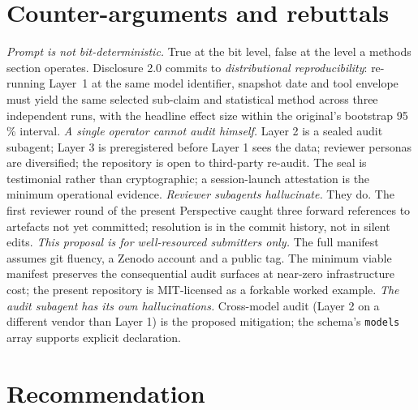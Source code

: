 \documentclass[11pt,a4paper]{article}
\begin{document}
\section{Counter-arguments and rebuttals}

\emph{Prompt is not bit-deterministic.} True at the bit level, false at the level a methods section operates. Disclosure 2.0 commits to \emph{distributional reproducibility}: re-running Layer~1 at the same model identifier, snapshot date and tool envelope must yield the same selected sub-claim and statistical method across three independent runs, with the headline effect size within the original's bootstrap 95\,\% interval. \emph{A single operator cannot audit himself.} Layer 2 is a sealed audit subagent; Layer 3 is preregistered before Layer 1 sees the data; reviewer personas are diversified; the repository is open to third-party re-audit. The seal is testimonial rather than cryptographic; a session-launch attestation is the minimum operational evidence. \emph{Reviewer subagents hallucinate.} They do. The first reviewer round of the present Perspective caught three forward references to artefacts not yet committed; resolution is in the commit history, not in silent edits. \emph{This proposal is for well-resourced submitters only.} The full manifest assumes git fluency, a Zenodo account and a public tag. The minimum viable manifest preserves the consequential audit surfaces at near-zero infrastructure cost; the present repository is MIT-licensed as a forkable worked example. \emph{The audit subagent has its own hallucinations.} Cross-model audit (Layer 2 on a different vendor than Layer 1) is the proposed mitigation; the schema's \texttt{models} array supports explicit declaration.

\section{Recommendation}
\end{document}
